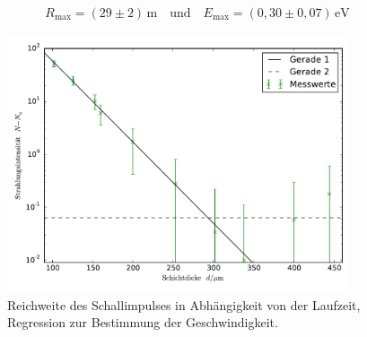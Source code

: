 \begin{align}
R_\mathup{max}=(29\pm2)\,\si\meter \quad\text{und}\quad E_\mathup{max}=(0,30\pm0,07)\,\mathup{e}\si\volt
\end{align}
\begin{figure}
	\centering
	\includegraphics[width=0.9\textwidth]{Bilder/beta.pdf}
	\caption{Reichweite des Schallimpulses in Abhängigkeit von der Laufzeit, Regression zur Bestimmung der Geschwindigkeit.}
	\label{fig:geschwindigkeit}
\end{figure}


